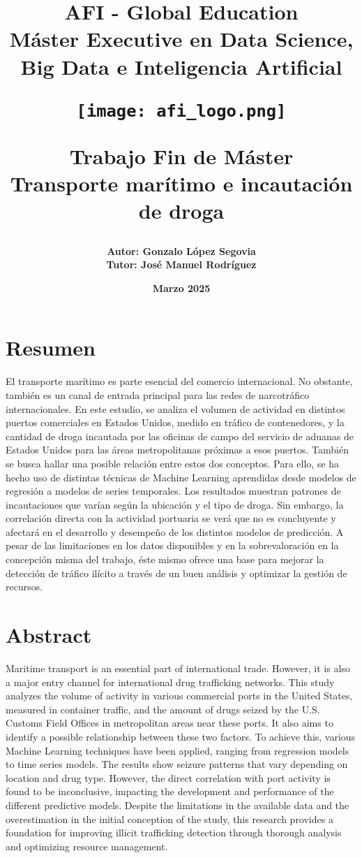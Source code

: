 \documentclass[12pt]{article}
\title{\bf AFI - Global Education\\
\vspace{3cm}
Máster Executive en Data Science, Big Data e Inteligencia Artificial\\
\vspace{2cm}
\begin{center}
	\hspace*{0cm}
	\texttt{[image: afi\_logo.png]} \\
\end{center}

\vspace{2cm}
Trabajo Fin de Máster\\
\vspace{1cm}
Transporte marítimo e incautación de droga
}
\author{
		\bf Autor: Gonzalo López Segovia \\
		\bf Tutor: José Manuel Rodríguez
	}
\date{\bf Marzo 2025}
\begin{document}
	

	

\maketitle

\newpage

\section{\label{resumen}Resumen}
El transporte marítimo es parte esencial del comercio internacional. No obstante, también es un canal de entrada principal para las redes de narcotráfico internacionales. En este estudio, se analiza el volumen de actividad en distintos puertos comerciales en Estados Unidos, medido en tráfico de contenedores, y la cantidad de droga incautada por las oficinas de campo del servicio de aduanas de Estados Unidos para las áreas metropolitanas próximas a esos puertos. También se busca hallar una posible relación entre estos dos conceptos. Para ello, se ha hecho uso de distintas técnicas de Machine Learning aprendidas desde modelos de regresión a modelos de series temporales. Los resultados muestran patrones de incautaciones que varían según la ubicación y el tipo de droga. Sin embargo, la correlación directa con la actividad portuaria se verá que no es concluyente y afectará en el desarrollo y desempeño de los distintos modelos de predicción. A pesar de las limitaciones en los datos disponibles y en la sobrevaloración en la concepción misma del trabajo, éste mismo ofrece una base para mejorar la detección de tráfico ilícito a través de un buen análisis y optimizar la gestión de recursos.

\section{\label{abstract}Abstract}
Maritime transport is an essential part of international trade. However, it is also a major entry channel for international drug trafficking networks. This study analyzes the volume of activity in various commercial ports in the United States, measured in container traffic, and the amount of drugs seized by the U.S. Customs Field Offices in metropolitan areas near these ports. It also aims to identify a possible relationship between these two factors. To achieve this, various Machine Learning techniques have been applied, ranging from regression models to time series models. The results show seizure patterns that vary depending on location and drug type. However, the direct correlation with port activity is found to be inconclusive, impacting the development and performance of the different predictive models. Despite the limitations in the available data and the overestimation in the initial conception of the study, this research provides a foundation for improving illicit trafficking detection through thorough analysis and optimizing resource management.
\end{document}
